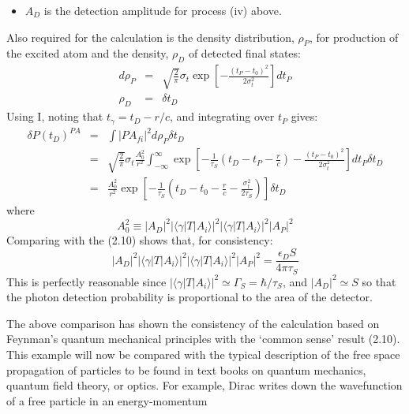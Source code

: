 \documentclass [12pt]{article}
\begin{document}
{\begin{itemize}
     The last member of (2.13) follows since the photon is a massless particle with constant velocity $c$:
     $c = E_{\gamma}/p_{\gamma} = r/(t_D-t_{\gamma})$.
 \item $A_D$ is the detection amplitude for process (iv) above.
   \end{itemize}
      Also required for the calculation is the density distribution, $\rho_P$, for 
    production of the excited 
    atom and the density, $\rho_D$ of detected final states:
  \begin{eqnarray}
   d\rho_P & = & \sqrt{\frac{2}{\pi}}\sigma_t \exp\left[ - \frac{(t_P-t_0)^2}{2\sigma_t^2}\right] dt_P  \\
       \rho_D & = &  \delta t_D
  \end{eqnarray}
   Using I, noting that $t_{\gamma} = t_D-r/c$, and integrating over $t_P$ gives:
 \begin{eqnarray}
  \delta P(t_D)^{PA} &=& \int | PA_{fi}|^2 d\rho_P \delta t_D~~~~~~~~~~~~~~~~~~~~~~~~~~~~~~~~ \nonumber \\
     &=& \sqrt{\frac{2}{\pi}}\sigma_t \frac{A_0^2}{r^2}                                
   \int_{-\infty}^{\infty}
    \exp\left[-\frac{1}{\tau_S}(t_D-t_P-\frac{r}{c})
     - \frac{(t_P-t_0)^2}{2 \sigma_t^2}\right] dt_P \delta t_D \nonumber \\
    &=&  \frac{A_0^2}{r^2}\exp\left[-\frac{1}{\tau_S}(t_D -t_0-\frac{r}{c}-\frac{\sigma_t^2}{2\tau_S})\right]
       \delta t_D    
 \end{eqnarray}
 where \[ A_0^2 \equiv |A_D|^2 |\langle\gamma|T|A_i\rangle|^2 |\langle\gamma|T|A_i\rangle|^2 |A_P|^2 \]     
   Comparing with the (2.10) shows that, for consistency:
    \begin{equation}
    |A_D|^2|\langle\gamma|T|A_i\rangle|^2|\langle\gamma|T|A_i\rangle|^2 |A_P |^2 =
    \frac{\epsilon_D S }{4 \pi \tau_S}    
  \end{equation}
     This is perfectly reasonable since $ |\langle\gamma|T|A_i\rangle|^2 \simeq  \Gamma_S = \hbar/ \tau_S$,
     and $ |A_D|^2  \simeq S$ so that the photon detection probability is
    proportional to the area of the detector.
    \par The above comparison has shown the consistency of the calculation based on Feynman's
    quantum mechanical principles with the `common sense' result (2.10). This example will
     now be compared with the typical description of the free space propagation of particles
    to be found in text books on quantum mechanics, quantum field theory, or optics.
    For example, Dirac writes down the wavefunction of a free particle in an energy-momentum
}
\end{document}
